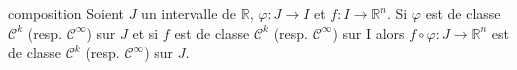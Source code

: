 \documentclass[french,11pt,twoside]{VcCours}
\newenvironment{ApplicationDirecte}{\textbf{Application directe du cours :}

}{}
\begin{document}
%


\begin{Proposition}{composition} Soient $J$ un intervalle de $\mathbb{R}$, $\varphi : J \rightarrow I$ et $f : I \rightarrow \mathbb{R}^n$. Si $\varphi$ est de classe $\mathcal{C}^k$ (resp. $\mathcal{C}^{\infty}$) sur $J$ et si $f$ est de classe $\mathcal{C}^k$ (resp. $\mathcal{C}^{\infty}$) sur I alors $f \circ \varphi : J \rightarrow \mathbb{R}^n$ est de classe $\mathcal{C}^k$ (resp. $\mathcal{C}^{\infty}$) sur $J$. 
\end{Proposition}

\newpage
\end{document}

